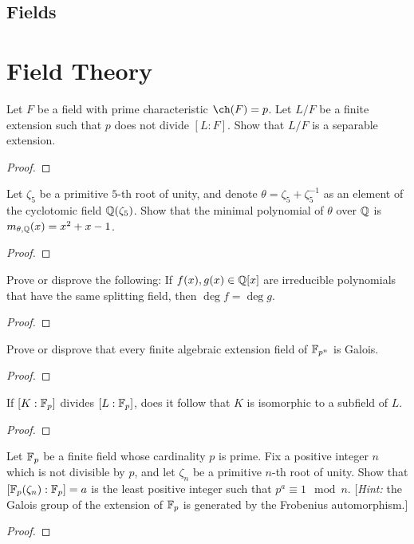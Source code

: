 \section{Fields}
\chapter{Field Theory}
\begin{problem}
Let $F$ be a field with prime characteristic $\ch(F)=p$. Let $L/F$ be a
finite extension such that $p$ does not divide $[L:F]$. Show that $L/F$ is
a separable extension.
\begin{proof}
\end{proof}
\end{problem}

\begin{problem}
Let $\zeta_5$ be a primitive $5$-th root of unity, and denote
$\theta=\zeta_5+\zeta_5^{-1}$ as an element of the cyclotomic field
$\mathbb{Q}(\zeta_5)$. Show that the minimal polynomial of $\theta$ over $\mathbb{Q}$
is $m_{\theta,\mathbb{Q}}(x)=x^2+x-1$.
\begin{proof}
\end{proof}
\end{problem}

\begin{problem}
Prove or disprove the following: If $f(x),g(x)\in\mathbb{Q}[x]$ are irreducible
polynomials that have the same splitting field, then $\deg f=\deg g$.
\begin{proof}
\end{proof}
\end{problem}

\begin{problem}
Prove or disprove that every finite algebraic extension field of
$\mathbb{F}_{p^n}$ is Galois.
\begin{proof}
\end{proof}
\end{problem}

\begin{problem}
If $[K:\mathbb{F}_p]$ divides $[L:\mathbb{F}_p]$, does it follow that $K$ is isomorphic
to a subfield of $L$.
\begin{proof}
\end{proof}
\end{problem}

\begin{problem}
Let $\mathbb{F}_p$ be a finite field whose cardinality $p$ is prime. Fix a
positive integer $n$ which is not divisible by $p$, and let $\zeta_n$ be a
primitive $n$-th root of unity. Show that $[\mathbb{F}_p(\zeta_n):\mathbb{F}_p]=a$ is
the least positive integer such that $p^a\equiv 1\mod n$. [\emph{Hint:} the
Galois group of the extension of $\mathbb{F}_p$ is generated by the Frobenius
automorphism.]
\begin{proof}

\end{proof}
\end{problem}


